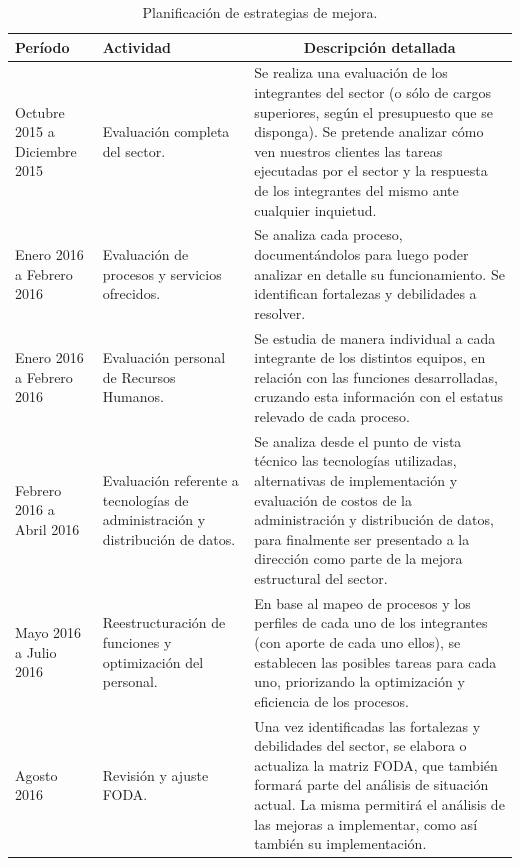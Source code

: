 \begin{center}
\begin{longtable}{|>{\centering\arraybackslash}m{3cm}|>{\centering\arraybackslash}m{3cm}|m{7cm}|}
\caption{Planificación de estrategias de mejora.}
\label{estrategias}
\\

\hline
\textbf{Período}
&
\textbf{Actividad}
&
\multicolumn{1}{c|}{\textbf{Descripción detallada}}
\\
\hline
\endhead
Octubre 2015 a Diciembre 2015
&
Evaluación completa del sector.
&
Se realiza una evaluación de los integrantes del sector (o sólo de cargos superiores, según el presupuesto que se disponga).
Se pretende analizar cómo ven nuestros clientes las tareas ejecutadas por el sector y la respuesta de los integrantes del mismo ante cualquier inquietud.
\\
\hline
Enero 2016 a Febrero 2016
&
Evaluación de procesos y servicios ofrecidos.
&
Se analiza cada proceso, documentándolos para luego poder analizar en detalle su funcionamiento. Se identifican fortalezas y debilidades a resolver.
\\
\hline
Enero 2016 a Febrero 2016
&
Evaluación personal de Recursos Humanos.
&
Se estudia de manera individual a cada integrante de los distintos equipos, en relación con las funciones desarrolladas, cruzando esta información con el estatus relevado de cada proceso.
\\
\hline
Febrero 2016 a Abril 2016
&
Evaluación referente a tecnologías de administración y distribución de datos.
&
Se analiza desde el punto de vista técnico las tecnologías utilizadas, alternativas de implementación y evaluación de costos de la administración y distribución de datos, para finalmente ser presentado a la dirección como parte de la mejora estructural del sector.
\\
\hline
Mayo 2016 a Julio 2016
&
Reestructuración de funciones y optimización del personal.
&
En base al mapeo de procesos y los perfiles de cada uno de los integrantes (con aporte de cada uno ellos), se establecen las posibles tareas para cada uno, priorizando la optimización y eficiencia de los procesos.
\\
\hline
Agosto 2016
&
Revisión y ajuste FODA.
&
Una vez identificadas las fortalezas y debilidades del sector, se  elabora o actualiza la matriz FODA, que también formará parte del análisis de situación actual. La misma permitirá el análisis de las mejoras a implementar, como así también su implementación.
\\

\end{longtable}
\end{center}
